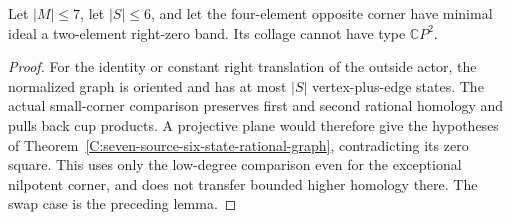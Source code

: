 \begin{theorem}
\label{C:seven-four-six-two-band-excluded}
Let $|M|\leq7$, let $|S|\leq6$, and let the
four-element opposite corner have minimal ideal
a two-element right-zero band.  Its collage
cannot have type $\mathbb CP^2$.
\end{theorem}
\begin{proof}
For the identity or constant right translation
of the outside actor, the normalized graph is
oriented and has at most $|S|$ vertex-plus-edge
states.  The actual small-corner comparison
preserves first and second rational homology
and pulls back cup products.  A projective
plane would therefore give the hypotheses
of Theorem~\ref{C:seven-source-six-state-rational-graph},
contradicting its zero square.
This uses only the low-degree comparison even
for the exceptional nilpotent corner, and does
not transfer bounded higher homology there.
The swap case is the preceding lemma.
\end{proof}
